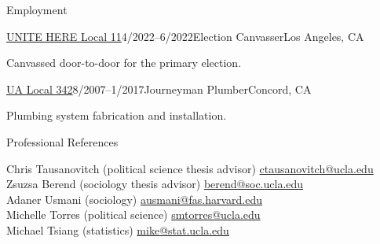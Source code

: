 \documentclass[
	12pt, %
]{resume} %
\begin{document}
\begin{rSection}{Employment}
	
	\begin{rSubsection}{\href{https://www.unitehere11.org/}{UNITE HERE Local 11}}{4/2022--6/2022}{Election Canvasser}{Los Angeles, CA}
	\item Canvassed door-to-door for the primary election.
	\end{rSubsection}

	\begin{rSubsection}{\href{https://ua342.org/}{UA Local 342}}{8/2007--1/2017}{Journeyman Plumber}{Concord, CA}
	\item Plumbing system fabrication and installation.
	\end{rSubsection}

\end{rSection}

\begin{rSection}{Professional References}

Chris Tausanovitch (political science thesis advisor) \hfill \href{mailto:ctausanovitch@ucla.edu}{ctausanovitch@ucla.edu}\\
Zsuzsa Berend (sociology thesis advisor) \hfill \href{mailto:berend@soc.ucla.edu}{berend@soc.ucla.edu}\\
Adaner Usmani (sociology) \hfill \href{mailto:ausmani@fas.harvard.edu}{ausmani@fas.harvard.edu}\\
Michelle Torres (political science) \hfill \href{mailto:smtorres@ucla.edu}{smtorres@ucla.edu}\\
Michael Tsiang (statistics) \hfill \href{mailto:mike@stat.ucla.edu}{mike@stat.ucla.edu}
\end{rSection}

\end{document}
